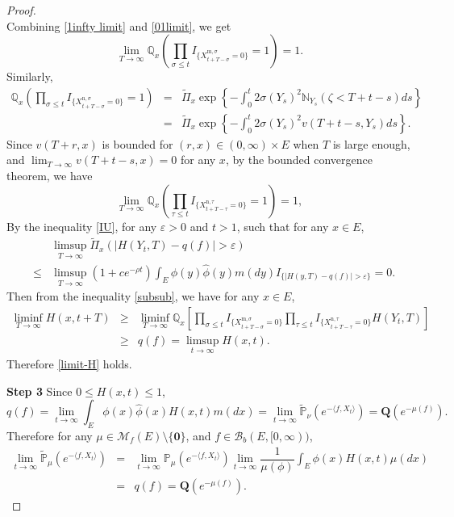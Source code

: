 \documentclass[12pt,a4paper]{amsart}
\numberwithin{equation}{section}
\theoremstyle{plain}
\theoremstyle{definition}
\theoremstyle{remark}
\begin{document}
\begin{proof}
\begin{equation}
\end{equation}
 Combining \eqref{1infty limit} and \eqref{01limit}, we get
\[
\lim_{T\rightarrow\infty}\mathbb Q_{x}\left(\prod_{\sigma\leq t}I_{\{ X_{t+T-\sigma}^{{\mathrm m},\sigma}=0\}}=1\right)=1.
\]
Similarly,
\begin{eqnarray*}
\mathbb Q_x\left(\prod_{\sigma\leq t}I_{\{ X_{t+T-\sigma}^{{\mathrm n},\sigma}=0\}}=1\right)
&=&\widetilde\Pi_x\exp\left\{-\int_0^t2\sigma(Y_s)^2\mathbb N_{Y_s}(\zeta<T+t-s)ds\right\}\\
&=&\widetilde\Pi_x\exp\left\{-\int_0^t2\sigma(Y_s)^2v(T+t-s,Y_s)ds\right\}.
\end{eqnarray*}
Since $v(T+r, x)$ is  bounded for $(r,x)\in (0,\infty)\times E$ when $T$ is large enough, and $\lim_{T\rightarrow\infty} v(T+t-s,x)=0$ for any $x$,  by the bounded convergence theorem, we  have
\[
\lim_{T\rightarrow\infty}\mathbb Q_x\left(\prod_{\tau\leq t}I_{\{ X_{t+T-\tau}^{{\mathrm n},\tau}=0\}}=1\right)=1,
\]
By the inequality \eqref{IU}, for any $\varepsilon>0$ and $t>1$,
such that for any $x\in E$,
\begin{eqnarray*}
&&\limsup_{T\rightarrow\infty}\widetilde\Pi_x\left(|H(Y_t, T)-q(f)|>\varepsilon\right)\\
&\leq& \limsup_{T\rightarrow\infty}(1+ce^{-\rho t})\int_E\phi(y)\widehat\phi(y)m(dy)I_{\{|H(y, T)-q(f)|>\varepsilon\}}=0.
\end{eqnarray*}
Then from the inequality \eqref{subsub}, we have for any $x\in E$,
\begin{eqnarray*}
\liminf_{T\rightarrow\infty}H(x, t+T)&\geq&  \liminf_{T\rightarrow\infty} \mathbb Q_x\left[\prod_{\sigma\leq t}I_{\{ X_{t+T-\sigma}^{{\mathrm m},\sigma}=0\}}\prod_{\tau\leq t}I_{\{ X_{t+T-\tau}^{{\mathrm n},\tau}=0\}}H(Y_t, T)\right]\\
&\geq& q(f)=\limsup_{t\rightarrow\infty}H(x, t).
\end{eqnarray*}
 Therefore \eqref{limit-H} holds.

{\bf Step 3}\quad
Since $0\leq H(x,t)\leq 1$,
\begin{equation*}
q(f)
=\lim_{t\rightarrow\infty}\int_E\phi(x)\widehat\phi(x)H(x,t)m(dx)
=\lim_{t\rightarrow\infty}\widetilde{\mathbb P}_{\nu}\left(e^{-\langle f, X_t\rangle }\right)
=\mathbf Q(e^{-\mu(f)}).
\end{equation*}
Therefore for any $\mu\in\mathcal M_f(E)\setminus\{\mathbf{0}\}$, and $f\in\mathcal B_b(E,[0,\infty))$,
\begin{eqnarray*}
\lim_{t\rightarrow\infty}\widetilde{\mathbb P}_\mu\left(e^{-\langle f, X_t\rangle}\right)&=&\lim_{t\rightarrow\infty}\mathbb P_\mu\left(e^{-\langle f, X_t\rangle}\right)
\lim_{t\to\infty}\dfrac{1}{\mu(\phi)}\int_E\phi(x)H(x, t)\mu(dx)\\
&=&q(f)=\mathbf Q(e^{-\mu(f)}).
\end{eqnarray*}


\end{proof}
\end{document}
